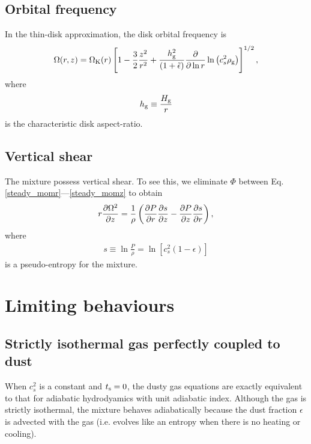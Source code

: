 \subsection{Orbital frequency} 
In the thin-disk approximation, the disk orbital frequency is 
\begin{align}
  \Omega(r,z) = \Omega_{\rm K}(r)\left[1 - \frac{3}{2}\frac{z^2}{r^2} +
    \frac{h_\mathrm{g}^2}{\left(1+\tilde{\epsilon}\right)}\frac{\partial}{\partial\ln{r}}\ln{\left(c_s^2\rho_\mathrm{g}\right)}
    \right]^{1/2}, 
\end{align}
where 
\begin{align}
  h_\mathrm{g} \equiv \frac{H_\mathrm{g}}{r}
\end{align}
is the characteristic disk aspect-ratio. 

\subsection{Vertical shear}
The mixture possess vertical shear. To see this, we eliminate $\Phi$
between Eq. \ref{steady_momr}---\ref{steady_momz} to 
obtain 
\begin{align}\label{vshear}
  r\frac{\partial \Omega^2}{\partial z} 
   = \frac{1}{\rho}\left(\frac{\partial P}{\partial r}\frac{\partial s}{\partial z} -\frac{\partial
    P}{\partial z}\frac{\partial s}{\partial r} \right),
\end{align}
where
\begin{align}
   s \equiv \ln \frac{P}{\rho} = \ln{\left[c_s^2(1-\epsilon)\right]} 
\end{align}
is a pseudo-entropy for the mixture. 

\section{Limiting behaviours}

\subsection{Strictly isothermal gas perfectly coupled to dust}  
When $c_s^2$ is a constant and $t_\mathrm{s}=0$, the dusty gas equations are
exactly equivalent to that for adiabatic hydrodyamics with unit adiabatic
index. Although the gas is strictly isothermal, the mixture behaves 
adiabatically because the dust fraction $\epsilon$ is advected with
the gas (i.e. evolves like an entropy when there is no heating or
cooling). 

